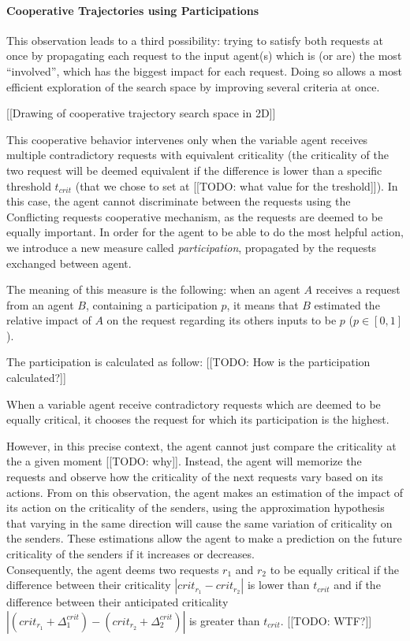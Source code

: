 \paragraph*{Cooperative Trajectories using Participations}
This observation leads to a third possibility: trying to satisfy both requests at once by propagating each request to the input agent(s) which is (or are) the most \enquote{involved}, which has the biggest impact for each request. Doing so allows a most efficient exploration of the search space by improving several criteria at once.

[[Drawing of cooperative trajectory search space in 2D]]

This cooperative behavior intervenes only when the variable agent receives multiple contradictory requests with equivalent criticality (the criticality of the two request will be deemed equivalent if the difference is lower than a specific threshold $t_{crit}$ (that we chose to set at [[TODO: what value for the treshold]]). In this case, the agent cannot discriminate between the requests using the Conflicting requests cooperative mechanism, as the requests are deemed to be equally important. In order for the agent to be able to do the most helpful action, we introduce a new measure called \emph{participation}, propagated by the requests exchanged between agent.

The meaning of this measure is the following: when an agent $A$ receives a request from an agent $B$, containing a participation $p$, it means that $B$ estimated the relative impact of $A$ on the request regarding its others inputs to be $p$ ($p \in [0,1]$).

The participation is calculated as follow:
[[TODO: How is the participation calculated?]]

When a variable agent receive contradictory requests which are deemed to be equally critical, it chooses the request for which its participation is the highest.

However, in this precise context, the agent cannot just compare the criticality at the a given moment [[TODO: why]]. Instead, the agent will memorize the requests and observe how the criticality of the next requests vary based on its actions. From on this observation, the agent makes an estimation of the impact of its action on the criticality of the senders, using the approximation hypothesis that varying in the same direction will cause the same variation of criticality on the senders. These estimations allow the agent to make a prediction on the future criticality of the senders if it increases or decreases.\\
Consequently, the agent deems two requests $r_1$ and $r_2$ to be equally critical if the difference between their criticality $|crit_{r_1} - crit_{r_2}|$ is lower than $t_{crit}$ and if the difference between their anticipated criticality $| (crit_{r_1} + \Delta_1^{crit}) - (crit_{r_2} + \Delta_2^{crit})|$ is greater than $t_{crit}$. [[TODO: WTF?]]


